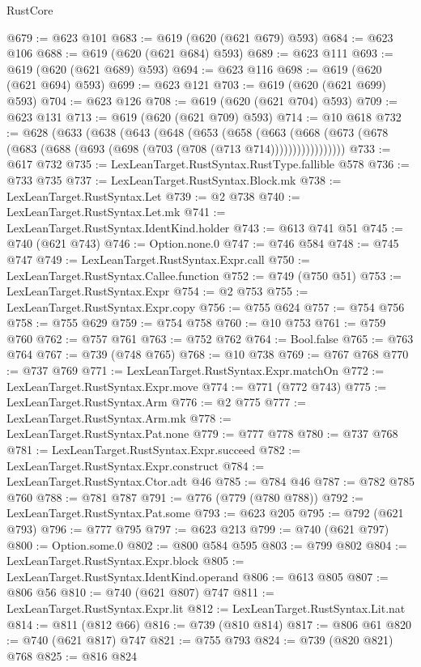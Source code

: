 \begin{lexlean}{RustCore}
\begin{coremodule}
@679 := @623 @101
@683 := @619 (@620 (@621 @679) @593)
@684 := @623 @106
@688 := @619 (@620 (@621 @684) @593)
@689 := @623 @111
@693 := @619 (@620 (@621 @689) @593)
@694 := @623 @116
@698 := @619 (@620 (@621 @694) @593)
@699 := @623 @121
@703 := @619 (@620 (@621 @699) @593)
@704 := @623 @126
@708 := @619 (@620 (@621 @704) @593)
@709 := @623 @131
@713 := @619 (@620 (@621 @709) @593)
@714 := @10 @618
@732 := @628
    (@633
      (@638
        (@643
          (@648
            (@653
              (@658
                (@663
                  (@668 (@673 (@678 (@683 (@688 (@693 (@698 (@703 (@708 (@713 @714)))))))))))))))))
@733 := @617 @732
@735 := LexLeanTarget.RustSyntax.RustType.fallible @578
@736 := @733 @735
@737 := LexLeanTarget.RustSyntax.Block.mk
@738 := LexLeanTarget.RustSyntax.Let
@739 := @2 @738
@740 := LexLeanTarget.RustSyntax.Let.mk
@741 := LexLeanTarget.RustSyntax.IdentKind.holder
@743 := @613 @741 @51
@745 := @740 (@621 @743)
@746 := Option.none.{0}
@747 := @746 @584
@748 := @745 @747
@749 := LexLeanTarget.RustSyntax.Expr.call
@750 := LexLeanTarget.RustSyntax.Callee.function
@752 := @749 (@750 @51)
@753 := LexLeanTarget.RustSyntax.Expr
@754 := @2 @753
@755 := LexLeanTarget.RustSyntax.Expr.copy
@756 := @755 @624
@757 := @754 @756
@758 := @755 @629
@759 := @754 @758
@760 := @10 @753
@761 := @759 @760
@762 := @757 @761
@763 := @752 @762
@764 := Bool.false
@765 := @763 @764
@767 := @739 (@748 @765)
@768 := @10 @738
@769 := @767 @768
@770 := @737 @769
@771 := LexLeanTarget.RustSyntax.Expr.matchOn
@772 := LexLeanTarget.RustSyntax.Expr.move
@774 := @771 (@772 @743)
@775 := LexLeanTarget.RustSyntax.Arm
@776 := @2 @775
@777 := LexLeanTarget.RustSyntax.Arm.mk
@778 := LexLeanTarget.RustSyntax.Pat.none
@779 := @777 @778
@780 := @737 @768
@781 := LexLeanTarget.RustSyntax.Expr.succeed
@782 := LexLeanTarget.RustSyntax.Expr.construct
@784 := LexLeanTarget.RustSyntax.Ctor.adt @46
@785 := @784 @46
@787 := @782 @785 @760
@788 := @781 @787
@791 := @776 (@779 (@780 @788))
@792 := LexLeanTarget.RustSyntax.Pat.some
@793 := @623 @205
@795 := @792 (@621 @793)
@796 := @777 @795
@797 := @623 @213
@799 := @740 (@621 @797)
@800 := Option.some.{0}
@802 := @800 @584 @595
@803 := @799 @802
@804 := LexLeanTarget.RustSyntax.Expr.block
@805 := LexLeanTarget.RustSyntax.IdentKind.operand
@806 := @613 @805
@807 := @806 @56
@810 := @740 (@621 @807) @747
@811 := LexLeanTarget.RustSyntax.Expr.lit
@812 := LexLeanTarget.RustSyntax.Lit.nat
@814 := @811 (@812 @66)
@816 := @739 (@810 @814)
@817 := @806 @61
@820 := @740 (@621 @817) @747
@821 := @755 @793
@824 := @739 (@820 @821) @768
@825 := @816 @824

\end{coremodule}
\end{lexlean}
